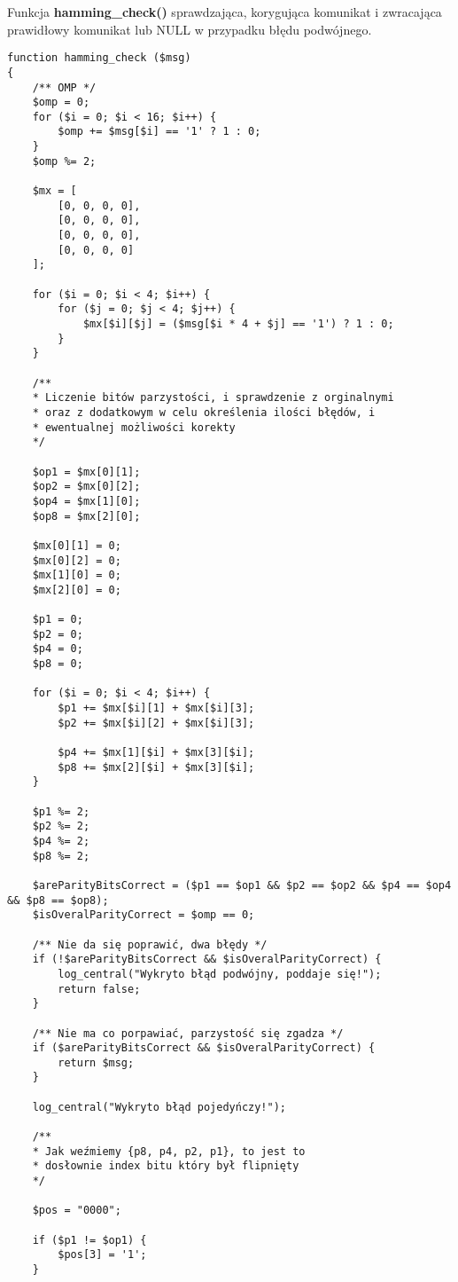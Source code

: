 Funkcja \textbf{hamming\_check()} sprawdzająca, korygująca komunikat i zwracająca prawidłowy komunikat lub NULL w przypadku błędu podwójnego.

\begin{empty}
	\begin{verbatim}
function hamming_check ($msg)
{
	/** OMP */
	$omp = 0;
	for ($i = 0; $i < 16; $i++) {
		$omp += $msg[$i] == '1' ? 1 : 0;
	}
	$omp %= 2;
	
	$mx = [
		[0, 0, 0, 0],
		[0, 0, 0, 0],
		[0, 0, 0, 0],
		[0, 0, 0, 0]
	];
	
	for ($i = 0; $i < 4; $i++) {
		for ($j = 0; $j < 4; $j++) {
			$mx[$i][$j] = ($msg[$i * 4 + $j] == '1') ? 1 : 0;
		}
	}
	
	/**
	* Liczenie bitów parzystości, i sprawdzenie z orginalnymi
	* oraz z dodatkowym w celu określenia ilości błędów, i 
	* ewentualnej możliwości korekty
	*/
	
	$op1 = $mx[0][1];
	$op2 = $mx[0][2];
	$op4 = $mx[1][0];
	$op8 = $mx[2][0];
	
	$mx[0][1] = 0;
	$mx[0][2] = 0;
	$mx[1][0] = 0;
	$mx[2][0] = 0;
	
	$p1 = 0;
	$p2 = 0;
	$p4 = 0;
	$p8 = 0;
	
	for ($i = 0; $i < 4; $i++) {
		$p1 += $mx[$i][1] + $mx[$i][3];
		$p2 += $mx[$i][2] + $mx[$i][3];
		
		$p4 += $mx[1][$i] + $mx[3][$i];
		$p8 += $mx[2][$i] + $mx[3][$i];
	}
	
	$p1 %= 2;
	$p2 %= 2;
	$p4 %= 2;
	$p8 %= 2;
	
	$areParityBitsCorrect = ($p1 == $op1 && $p2 == $op2 && $p4 == $op4 && $p8 == $op8);
	$isOveralParityCorrect = $omp == 0;
	
	/** Nie da się poprawić, dwa błędy */
	if (!$areParityBitsCorrect && $isOveralParityCorrect) {
		log_central("Wykryto błąd podwójny, poddaje się!");
		return false;
	}
	
	/** Nie ma co porpawiać, parzystość się zgadza */
	if ($areParityBitsCorrect && $isOveralParityCorrect) {
		return $msg;
	}
	
	log_central("Wykryto błąd pojedyńczy!");
	
	/**
	* Jak weźmiemy {p8, p4, p2, p1}, to jest to
	* dosłownie index bitu który był flipnięty
	*/
	
	$pos = "0000";
	
	if ($p1 != $op1) {
		$pos[3] = '1';
	}
	

\end{verbatim}
\end{empty}
